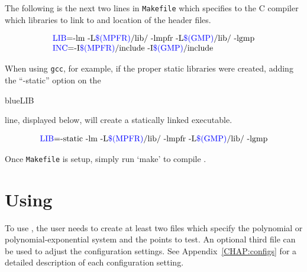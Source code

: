 \documentclass[11pt]{report}
\begin{document}
The following is the next two lines in {\tt Makefile}
which specifies to the C compiler which libraries to link to
and location of the header files.

$$\begin{array}{l}
\hbox{\begin{color}{blue}LIB\end{color}=-lm -L\begin{color}{blue}\$(MPFR)\end{color}/lib/ -lmpfr -L\begin{color}{blue}\$(GMP)\end{color}/lib/ -lgmp} \\
\hbox{\begin{color}{blue}INC\end{color}=-I\begin{color}{blue}\$(MPFR)\end{color}/include -I\begin{color}{blue}\$(GMP)\end{color}/include}
\end{array}$$

When using {\tt gcc}, for example, if the proper static libraries were created,
adding the ``-static'' option on the \begin{color}{blue}LIB\end{color} line, displayed below,
will create a statically linked executable.

$$\begin{array}{l}
\hbox{\begin{color}{blue}LIB\end{color}=-static -lm -L\begin{color}{blue}\$(MPFR)\end{color}/lib/ -lmpfr -L\begin{color}{blue}\$(GMP)\end{color}/lib/ -lgmp}
\end{array}$$

Once {\tt Makefile} is setup, simply run `make' to compile \alphaCertified.

\section{Using \alphaCertified}\label{CHAP:use}

To use \alphaCertified, the user needs to create at least two files which specify
the polynomial or polynomial-exponential system and the points to test.  
An optional third file can be used to adjust the configuration settings.  
See Appendix~\ref{CHAP:configs} for a detailed description of each configuration setting.
\end{document}

